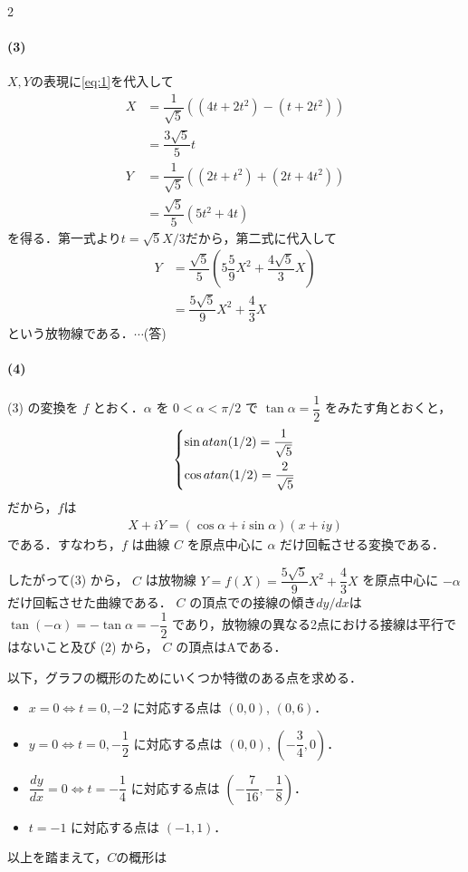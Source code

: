 \documentclass[../../main.tex]{subfiles}
\begin{document}
\begin{multicols}{2}
  \paragraph{(3)}
  $X,Y$の表現に\cref{eq:1}を代入して
  \begin{align}
    X
    & = \dfrac{1}{\sqrt{5}}((4t+2t^2)-(t+2t^2)) \\
    & = \dfrac{3\sqrt{5}}{5}t                   \\
    Y
    & = \dfrac{1}{\sqrt{5}}((2t+t^2)+(2t+4t^2)) \\
    & = \dfrac{\sqrt{5}}{5}(5t^2+4t)
  \end{align}
  を得る．第一式より$t = \sqrt{5}X/3$だから，第二式に代入して
  \begin{align}
    Y
    & = \dfrac{\sqrt{5}}{5}\left(5\dfrac{5}{9}X^2 + \dfrac{4\sqrt{5}}{3}X \right) \\
    & = \dfrac{5\sqrt{5}}{9}X^2 + \dfrac{4}{3}X
  \end{align}
  という放物線である．$\cdots$(答)

  \paragraph{(4)}
  (3) の変換を $f$ とおく．$\alpha$ を $0 < \alpha < \pi/2$ で $\tan\alpha = \dfrac{1}{2}$ をみたす角とおくと，
  \begin{align}
    \begin{dcases}
      \sin \alpha = \dfrac{1}{\sqrt{5}} \\
      \cos \alpha = \dfrac{2}{\sqrt{5}}
    \end{dcases}
  \end{align}
  だから，$f$は
  \begin{align}
    X + iY = (\cos\alpha + i\sin\alpha)(x+iy)
  \end{align}
  である．すなわち，$f$ は曲線 $C$ を原点中心に $\alpha$ だけ回転させる変換である．

  したがって(3) から， $C$ は放物線 $Y = f(X) = \dfrac{5\sqrt{5}}{9}X^2 + \dfrac{4}{3}X$ を原点中心に $-\alpha$ だけ回転させた曲線である．
  $C$ の頂点での接線の傾き$dy/dx$は $\tan(-\alpha) = -\tan\alpha = -\dfrac{1}{2}$ であり，放物線の異なる2点における接線は平行ではないこと及び (2) から，
  $C$ の頂点はAである．

  以下，グラフの概形のためにいくつか特徴のある点を求める．
  \begin{itemize}
    \item $x=0 \iff t=0, -2$ に対応する点は $(0,0)$, $(0,6)$．
    \item $y=0 \iff t=0, -\dfrac{1}{2}$ に対応する点は $(0,0)$, $(-\dfrac{3}{4},0)$．
    \item $\dfrac{dy}{dx}=0 \iff t = -\dfrac{1}{4}$ に対応する点は $(-\dfrac{7}{16}, -\dfrac{1}{8})$．
    \item $t=-1$ に対応する点は $(-1,1)$．
  \end{itemize}
  以上を踏まえて，$C$の概形は


\end{multicols}
\end{document}

